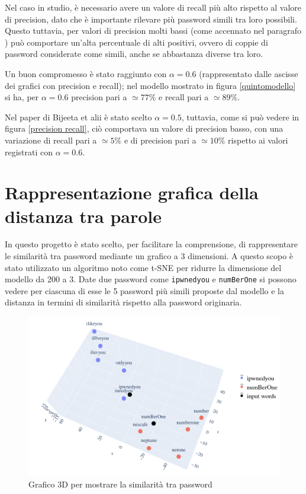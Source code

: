 Nel caso in studio, è necessario avere un valore di recall più alto rispetto al valore di precision, dato che è importante rilevare più password simili tra loro possibili. Questo tuttavia, per valori di precision molti bassi (come accennato nel paragrafo   ) può comportare un'alta percentuale di alti positivi, ovvero di coppie di password considerate come simili, anche se abbastanza diverse tra loro.

Un buon compromesso è stato raggiunto con $\alpha = 0.6$ (rappresentato dalle ascisse dei grafici con precision e recall); nel modello mostrato in figura \ref{quintomodello} si ha, per $\alpha = 0.6$ precision pari a $\simeq 77\%$ e recall pari a $\simeq 89\%$.

Nel paper di Bijeeta et alii \cite{biijeta} è stato scelto $\alpha = 0.5$, tuttavia, come si può vedere in figura \ref{precision recall}, ciò comportava un valore di precision basso, con una variazione di recall pari a $\simeq 5\%$ e di precision pari a $\simeq 10\%$ rispetto ai valori registrati con $\alpha = 0.6$.
\section{Rappresentazione grafica della distanza tra parole}
\label{sec:rappresentazione grafica distanza tra parole}
In questo progetto è stato scelto, per facilitare la comprensione, di rappresentare le similarità tra password mediante un grafico a 3 dimensioni. A questo scopo è stato utilizzato un algoritmo noto come t-SNE per ridurre la dimensione del modello da 200 a 3.
Date due password come \texttt{ipwnedyou} e \texttt{numBerOne} si possono vedere per ciascuna di esse le 5 password più simili proposte dal modello e la distanza in termini di similarità rispetto alla password originaria.
\begin{figure}[H]
    \centering
    \includegraphics[width=15cm]{./immagini/3dplot.png}
    \caption{Grafico 3D per mostrare la similarità tra password}
    \label{3d}
\end{figure}